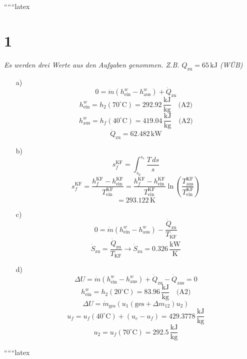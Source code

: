 
``````latex


\section*{1}
\textit{Es werden drei Werte aus den Aufgaben genommen. Z.B. \(Q_{\text{zu}} = 65 \, \text{kJ}\) (WÜB)}

\begin{itemize}
    \item[a)] 
    \[
    0 = \dot{m} \left( h_{\text{ein}}^{w} - h_{\text{aus}}^{w} \right) + \dot{Q}_{\text{zu}}
    \]
    \[
    h_{\text{ein}}^{w} = h_{2} (70^\circ \text{C}) = 292.92 \, \frac{\text{kJ}}{\text{kg}} \quad \text{(A2)}
    \]
    \[
    h_{\text{aus}}^{w} = h_{f} (40^\circ \text{C}) = 419.04 \, \frac{\text{kJ}}{\text{kg}} \quad \text{(A2)}
    \]
    \[
    \dot{Q}_{\text{zu}} = \boxed{62.482 \, \text{kW}}
    \]

    \item[b)] 
    \[
    s_{f}^{\text{KF}} = \int_{s_{0}}^{s_{e}} \frac{T \, ds}{s}
    \]
    \[
    s_{f}^{\text{KF}} = \frac{h_{f}^{\text{KF}} - h_{\text{ein}}^{\text{KF}}}{T_{\text{ein}}^{\text{KF}}} = \frac{h_{f}^{\text{KF}} - h_{\text{ein}}^{\text{KF}}}{T_{\text{ein}}^{\text{KF}}} \ln \left( \frac{T_{\text{aus}}^{\text{KF}}}{T_{\text{ein}}^{\text{KF}}} \right)
    \]
    \[
    = \boxed{293.122 \, \text{K}}
    \]

    \item[c)] 
    \[
    0 = \dot{m} \left( h_{\text{ein}}^{w} - h_{\text{aus}}^{w} \right) - \frac{\dot{Q}_{\text{zu}}}{T_{\text{KF}}}
    \]
    \[
    \dot{S}_{\text{zu}} = \frac{\dot{Q}_{\text{zu}}}{T_{\text{KF}}} \rightarrow \dot{S}_{\text{zu}} = \boxed{0.326 \, \frac{\text{kW}}{\text{K}}}
    \]

    \item[d)] 
    \[
    \Delta U = \dot{m} \left( h_{\text{ein}}^{w} - h_{\text{aus}}^{w} \right) + \dot{Q}_{\text{zu}} - \dot{Q}_{\text{aus}} = 0
    \]
    \[
    h_{\text{ein}}^{w} = h_{2} (20^\circ \text{C}) = 83.96 \, \frac{\text{kJ}}{\text{kg}} \quad \text{(A2)}
    \]
    \[
    \Delta U = \dot{m}_{\text{ges}} \left( u_{1} \left( \text{ges} + \Delta m_{12} \right) u_{2} \right)
    \]
    \[
    u_{f} = u_{f} (40^\circ \text{C}) + (u_{c} - u_{f}) = 429.3778 \, \frac{\text{kJ}}{\text{kg}}
    \]
    \[
    u_{2} = u_{f} (70^\circ \text{C}) = \boxed{292.5 \, \frac{\text{kJ}}{\text{kg}}}
    \]
\end{itemize}

``````latex


